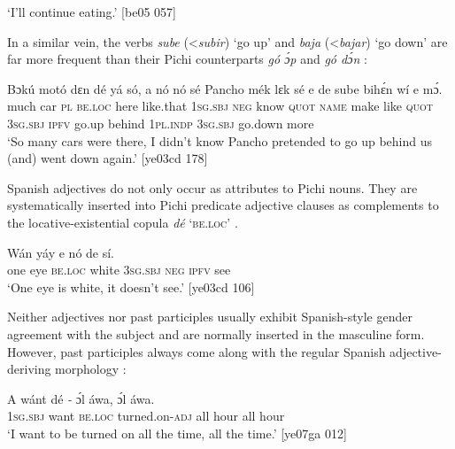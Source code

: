 \glt ‘I’ll continue eating.’ [be05 057]
\z

In a similar vein, the verbs \textit{sube} (<\textit{subir}) ‘go up’ and \textit{baja} (<\textit{bajar}) ‘go down’ are far more frequent than their Pichi counterparts\textit{ gó ɔ́p} and \textit{gó dɔ́n} : 


\ea%
    \label{ex:key:1715}
    \gll Bɔkú  motó  dɛn  dé    yá    só,    a    nó  nó    sé
Pancho  mék    lɛk  sé    e    de  sube    bihɛ́n
wí    e        mɔ́.\\
much  car    \textsc{pl}  \textsc{be.loc}  here    like.that  \textsc{1sg.sbj}  \textsc{neg}  know  \textsc{quot}
\textsc{name}  make  like  \textsc{quot}    \textsc{3sg.sbj}  \textsc{ipfv}  go.up  behind
\textsc{1pl.indp}  \textsc{3sg.sbj}  go.down  more\\

\glt ‘So many cars were there, I didn’t know Pancho pretended to 
go up behind us (and) went down again.’ [ye03cd 178]
\z

Spanish adjectives do not only occur as attributes to Pichi nouns. They are systematically inserted into Pichi predicate adjective clauses as complements to the locative-existential copula \textit{dé} \textsc{‘be.loc’} . 


\ea%
    \label{ex:key:1716}
    \gll Wán    yáy        e    nó  de  sí.\\
one    eye  \textsc{be.loc}  white  \textsc{3sg.sbj}  \textsc{neg}  \textsc{ipfv}  see\\
\glt ‘One eye is white, it doesn’t see.’ [ye03cd 106]
\z

Neither adjectives nor past participles usually exhibit Spanish-style gender agreement with the subject and are normally inserted in the masculine form. However, past participles always come along with the regular Spanish adjective-deriving morphology :


\ea%
    \label{ex:key:1717}
    \gll \MakeUppercase{A}   wánt  dé    \textit{{}-}      ɔ́l  áwa,    ɔ́l  áwa.\\
\textsc{1sg.sbj}  want  \textsc{be.loc}  turned.on-\textsc{adj}    all  hour  all  hour\\

\glt ‘I want to be turned on all the time, all the time.’ [ye07ga 012]
\z

